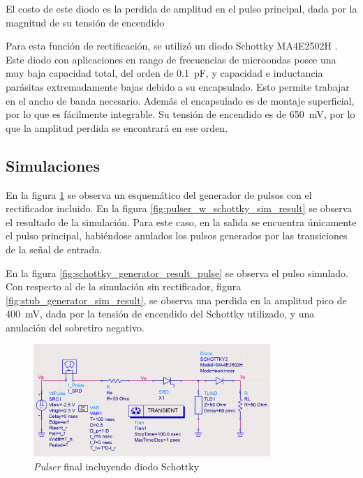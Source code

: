 El costo de este diodo es la perdida de amplitud en el pulso principal, dada por
la magnitud de su tensión de encendido

Para esta función de rectificación, se utilizó un diodo Schottky MA4E2502H
\cite{MA4E2502H-datasheet}. Este diodo con aplicaciones en rango de frecuencias
de microondas posee una muy baja capacidad total, del orden de
\qty{0.1}{\pico\farad}, y capacidad e inductancia parásitas extremadamente bajas
debido a su encapsulado. Esto permite trabajar en el ancho de banda necesario.
Además el encapsulado es de montaje superficial, por lo que es fácilmente
integrable. Su tensión de encendido es de \qty{650}{\milli\volt}, por lo que la
amplitud perdida se encontrará en ese orden.

\subsection{Simulaciones}

En la figura \ref{fig:pulser_w_schottky_sch} se observa un esquemático del
generador de pulsos con el rectificador incluido. En la figura
\ref{fig:pulser_w_schottky_sim_result} se observa el resultado de la
simulación. Para este caso, en la salida se encuentra únicamente el pulso
principal, habiéndose anulados los pulsos generados por las transiciones de la
señal de entrada.

En la figura \ref{fig:schottky_generator_result_pulse} se observa el pulso
simulado. Con respecto al de la simulación sin rectificador, figura
\ref{fig:stub_generator_sim_result}, se observa una perdida en la amplitud pico de
\qty{400}{\milli\volt}, dada por la tensión de encendido del Schottky
utilizado, y una anulación del sobretiro negativo.

\begin{figure}[tbp]
    \centering
    \includegraphics[width=0.8\textwidth]{images/pulser_w_schottky_sch.png}
    \caption{\textit{Pulser} final incluyendo diodo Schottky}
    \label{fig:pulser_w_schottky_sch}
\end{figure}

